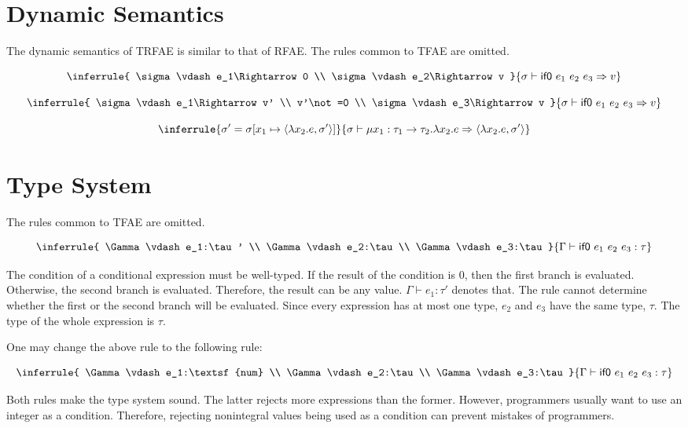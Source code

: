 \section{Dynamic Semantics}

The dynamic semantics of TRFAE is similar to that of RFAE. The rules common to
TFAE are omitted.

\[
\inferrule
{ \sigma\vdash e_1\Rightarrow 0 \\
  \sigma\vdash e_2\Rightarrow v }
{ \sigma\vdash\textsf{if0}\ e_1\ e_2\ e_3\Rightarrow v}
\]

\[
\inferrule
{ \sigma\vdash e_1\Rightarrow v' \\
  v'\not=0 \\
  \sigma\vdash e_3\Rightarrow v }
{ \sigma\vdash\textsf{if0}\ e_1\ e_2\ e_3\Rightarrow v}
\]

\[
\inferrule
{ \sigma'=\sigma\lbrack x_1\mapsto\langle\lambda x_2.e,\sigma'\rangle\rbrack }
{ \sigma\vdash\mu x_1:\tau_1\rightarrow\tau_2.\lambda
x_2.e\Rightarrow\langle\lambda x_2.e,\sigma'\rangle}
\]

\section{Type System}

The rules common to TFAE are omitted.

\[
\inferrule
{ \Gamma\vdash e_1:\tau' \\
  \Gamma\vdash e_2:\tau \\
  \Gamma\vdash e_3:\tau }
{ \Gamma\vdash\textsf{if0}\ e_1\ e_2\ e_3:\tau}
\]

The condition of a conditional expression must be well-typed. If the result of
the condition is $0$, then the first branch is evaluated. Otherwise, the second
branch is evaluated. Therefore, the result can be any value. $\Gamma\vdash
e_1:\tau'$ denotes that. The rule cannot determine whether the first or the
second branch will be evaluated. Since every expression has at most one type,
$e_2$ and $e_3$ have the same type, $\tau$. The type of the whole expression is
$\tau$.

One may change the above rule to the following rule:

\[
\inferrule
{ \Gamma\vdash e_1:\textsf{num} \\
  \Gamma\vdash e_2:\tau \\
  \Gamma\vdash e_3:\tau }
{ \Gamma\vdash\textsf{if0}\ e_1\ e_2\ e_3:\tau}
\]

Both rules make the type system sound. The latter rejects more expressions than
the former. However, programmers usually want to use an integer as a condition.
Therefore, rejecting nonintegral values being used as a condition can prevent
mistakes of programmers.

